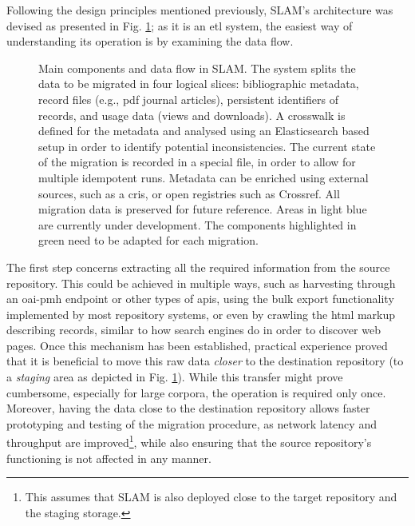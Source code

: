 Following the design principles mentioned previously, SLAM's architecture was devised as presented in Fig. \ref{fig:workflow}; as it is an \gls{etl} system, the easiest way of understanding its operation is by examining the data flow.

\begin{figure}
  \centering
  \caption{Main components and data flow in SLAM. The system splits the data to be migrated in four logical slices: bibliographic metadata, record files (e.g., \gls{pdf} journal articles), persistent identifiers of records, and usage data (views and downloads). A crosswalk is defined for the metadata and analysed using an Elasticsearch based setup in order to identify potential inconsistencies. The current state of the migration is recorded in a special file, in order to allow for multiple idempotent runs. Metadata can be enriched using external sources, such as a \gls{cris}, or open registries such as Crossref. All migration data is preserved for future reference. Areas in light blue are currently under development. The components highlighted in green need to be adapted for each migration.}
  \label{fig:workflow}
\end{figure}
\afterpage{\clearpage}

The first step concerns extracting all the required information from the source repository. This could be achieved in multiple ways, such as harvesting through an \gls{oai}-\gls{pmh} endpoint or other types of \glspl{api}, using the bulk export functionality implemented by most repository systems, or even by crawling the \gls{html} markup describing records, similar to how search engines do in order to discover web pages. Once this mechanism has been established, practical experience proved that it is beneficial to move this raw data \emph{closer} to the destination repository (to a \emph{staging} area as depicted in Fig. \ref{fig:workflow}). While this transfer might prove cumbersome, especially for large corpora, the operation is required only once. Moreover, having the data close to the destination repository allows faster prototyping and testing of the migration procedure, as network latency and throughput are improved\footnote{This assumes that SLAM is also deployed close to the target repository and the staging storage.}, while also ensuring that the source repository's functioning is not affected in any manner.

